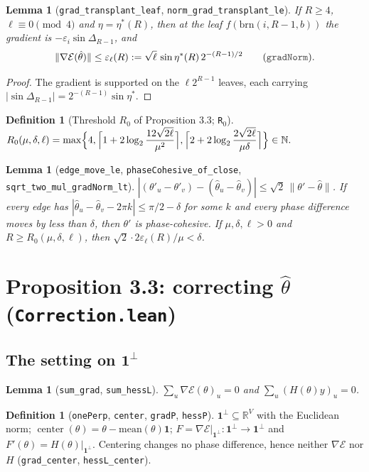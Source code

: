 \documentclass[11pt]{amsart}
\newcommand{\leanname}[1]{\texttt{\textcolor{black!75}{#1}}}
\newcommand{\lfile}[1]{\texttt{#1}}
\newcommand{\E}{\mathcal{E}}
\newcommand{\R}{\mathbb{R}}
\newcommand{\N}{\mathbb{N}}
\newcommand{\one}{\mathbf{1}}
\theoremstyle{plain}
\newtheorem{lemma}[theorem]{Lemma}
\theoremstyle{definition}
\newtheorem{definition}[theorem]{Definition}
\theoremstyle{remark}
\begin{document}
\begin{lemma}[\leanname{grad\_transplant\_leaf}, \leanname{norm\_grad\_transplant\_le}]
If $R\ge4$, $\ell\equiv0\pmod4$ and $\eta=\eta^*(R)$, then at the leaf $f(\mathrm{brn}(i,R-1,b))$ the
gradient is $-\varepsilon_i\sin\Delta_{R-1}$, and
\[
\|\nabla\E(\hat\theta)\|\le\varepsilon_\ell(R):=\sqrt\ell\,\sin\eta^*(R)\,2^{-(R-1)/2}
\qquad(\leanname{gradNorm}).
\]
\end{lemma}
\begin{proof}
The gradient is supported on the $\ell2^{R-1}$ leaves, each carrying
$|\sin\Delta_{R-1}|=2^{-(R-1)}\sin\eta^*$.
\end{proof}

\begin{definition}[Threshold $R_0$ of Proposition 3.3; \leanname{R}$_0$]
$\displaystyle R_0(\mu,\delta,\ell)=\max\Bigl\{4,\Bigl\lceil1+2\log_2\frac{12\sqrt{2\ell}}{\mu^2}\Bigr\rceil,
\Bigl\lceil2+2\log_2\frac{2\sqrt{2\ell}}{\mu\delta}\Bigr\rceil\Bigr\}\in\N.$
\end{definition}

\begin{lemma}[\leanname{edge\_move\_le}, \leanname{phaseCohesive\_of\_close}, \leanname{sqrt\_two\_mul\_gradNorm\_lt}]
$|(\theta'_u-\theta'_v)-(\hat\theta_u-\hat\theta_v)|\le\sqrt2\,\|\theta'-\hat\theta\|$. If every
edge has $|\hat\theta_u-\hat\theta_v-2\pi k|\le\pi/2-\delta$ for some $k$ and every phase
difference moves by less than $\delta$, then $\theta'$ is phase-cohesive. If $\mu,\delta,\ell>0$ and
$R\ge R_0(\mu,\delta,\ell)$, then $\sqrt2\cdot2\varepsilon_\ell(R)/\mu<\delta$.
\end{lemma}

\section{Proposition 3.3: correcting $\hat\theta$ (\lfile{Correction.lean})}

\subsection{The setting on $\one^\perp$}

\begin{lemma}[\leanname{sum\_grad}, \leanname{sum\_hessL}]
$\sum_u\nabla\E(\theta)_u=0$ and $\sum_u(H(\theta)y)_u=0$.
\end{lemma}

\begin{definition}[\leanname{onePerp}, \leanname{center}, \leanname{gradP}, \leanname{hessP}]
$\one^\perp\subseteq\R^V$ with the Euclidean norm; $\operatorname{center}(\theta)=\theta-\mathrm{mean}(\theta)\one$;
$F=\nabla\E|_{\one^\perp}:\one^\perp\to\one^\perp$ and $F'(\theta)=H(\theta)|_{\one^\perp}$.
Centering changes no phase difference, hence neither $\nabla\E$ nor $H$
(\leanname{grad\_center}, \leanname{hessL\_center}).
\end{definition}
\end{document}
